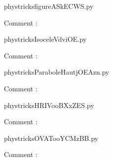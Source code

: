 
    \newcommand{\CaptionFigfigureASkECWS}{<+Type your caption here+>}
    \begin{center}
        
    \end{center}
    phystricksfigureASkECWS.py

    Comment : 

    \clearpage
    


    \newcommand{\CaptionFigIsoceleVdviOE}{<+Type your caption here+>}
    \begin{center}
        
    \end{center}
    phystricksIsoceleVdviOE.py

    Comment : 

    \clearpage
    


    \newcommand{\CaptionFigParaboleHautjOEAzn}{<+Type your caption here+>}
    \begin{center}
        
    \end{center}
    phystricksParaboleHautjOEAzn.py

    Comment : 

    \clearpage
    


    \newcommand{\CaptionFigHRIVooBXxZES}{<+Type your caption here+>}
    \begin{center}
        
    \end{center}
    phystricksHRIVooBXxZES.py

    Comment : 

    \clearpage
    


    \newcommand{\CaptionFigOVATooYCMzBB}{<+Type your caption here+>}
    \begin{center}
        
    \end{center}
    phystricksOVATooYCMzBB.py

    Comment : 

    \clearpage
    


